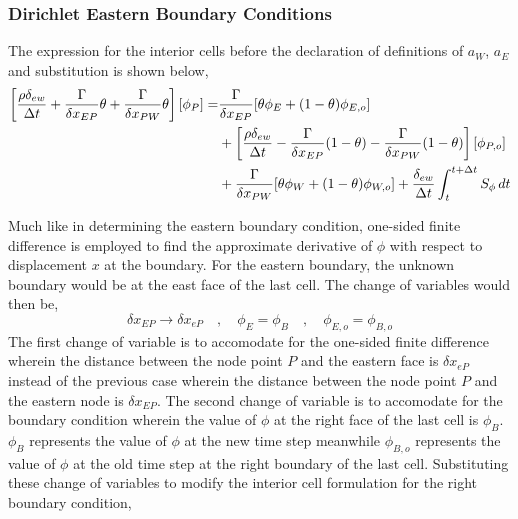 \documentclass[class=report, 12pt, crop=false]{standalone}
\begin{document}
\begin{center}
\subsubsection{Dirichlet Eastern Boundary Conditions}
The expression for the interior cells before the declaration of definitions of $a_W$, $a_E$ and substitution is shown below,
\begin{equation*}
\begin{split}
\left[\frac{\rho\delta_{ew}}{\Delta t} + \frac{\Gamma}{\delta x_{EP}}\theta + \frac{\Gamma}{\delta x_{PW}}\theta\right][\phi_{P}] = & \frac{\Gamma }{\delta x_{EP}}[\theta\phi_{E} + (1-\theta)\phi_{E,o}]\\ & +\left[\frac{\rho\delta_{ew}}{\Delta t} - \frac{\Gamma }{\delta x_{EP}}(1-\theta) - \frac{\Gamma }{\delta x_{PW}}(1-\theta)\right][\phi_{P,o}] \\ &  + \frac{\Gamma }{\delta x_{PW}}[\theta\phi_{W} + (1-\theta)\phi_{W,o}] + \frac{\delta_{ew}}{\Delta t}\int^{t+\Delta t}_{t} S_\phi\,dt 
\end{split}
\end{equation*}

Much like in determining the eastern boundary condition, one-sided finite difference is employed to find the approximate derivative of $\phi$ with respect to displacement $x$ at the boundary. For the eastern boundary, the unknown boundary would be at the east face of the last cell. The change of variables would then be,
$$\delta x_{EP}\to \delta x_{eP} \quad,\quad \phi_{E} = \phi_{B} \quad,\quad \phi_{E,o} = \phi_{B,o}$$
The first change of variable is to accomodate for the one-sided finite difference wherein the distance between the node point $P$ and the eastern face is $\delta x_{eP}$ instead of the previous case wherein the distance between the node point $P$ and the eastern node is $\delta x_{EP}$. The second change of variable is to accomodate for the boundary condition wherein the value of $\phi$ at the right face of the last cell is $\phi_{B}$. $\phi_{B}$ represents the value of $\phi$ at the new time step meanwhile $\phi_{B,o}$ represents the value of $\phi$ at the old time step at the right boundary of the last cell. Substituting these change of variables to modify the interior cell formulation for the right boundary condition,


\end{center}
\end{document}
